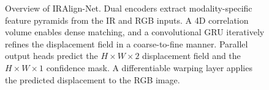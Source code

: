 \begin{figure}[t]
  \centering
  \caption{Overview of IRAlign-Net.  Dual encoders extract modality-specific
  feature pyramids from the IR and RGB inputs.  A 4D correlation volume
  enables dense matching, and a convolutional GRU iteratively refines
  the displacement field in a coarse-to-fine manner.  Parallel output
  heads predict the $H \times W \times 2$ displacement field and the
  $H \times W \times 1$ confidence mask.  A differentiable warping
  layer applies the predicted displacement to the RGB image.}
  \label{fig:architecture}
\end{figure}


